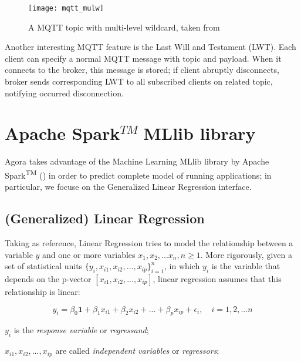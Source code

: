 \begin{figure}[htb]

    \centering
    \texttt{[image: mqtt\_mulw]}
    \caption[A MQTT topic with multi-level wildcard]{A MQTT topic with multi-level wildcard, taken from \cite{site:hivemq}}
    \label{fig:mqtt_mulw}

\end{figure}

Another interesting MQTT feature is the Last Will and Testament (LWT). Each client can specify a normal MQTT message with topic and payload. When it connects to the broker, this message is stored; if client abruptly disconnects, broker sends corresponding LWT to all subscribed clients on related topic, notifying occurred disconnection.





\section{Apache Spark\texorpdfstring{$^{TM}\;$}MMLlib library}

Agora takes advantage of the Machine Learning MLlib library by Apache Spark\textsuperscript{TM} (\cite{spark2015apache}) in order to predict complete model of running applications; in particular, we focuse on the Generalized Linear Regression interface.


\subsection{(Generalized) Linear Regression}\label{glr}

Taking \cite{site:caltechML2012} as reference, Linear Regression tries to model the relationship between a variable $y$ and one or more variables $x_1,x_2,...x_n,n\ge1$. More rigorously, given a set of statistical units $\{y_i,x_{i1},x_{i2},...,x_{ip}\}_{i = 1}^n$, in which $y_i$ is the variable that depends on the p-vector $[x_{i1}, x_{i2}, ..., x_{ip}]$, linear regression assumes that this relationship is linear:

\begin{equation}
    y_i = \beta_0\boldsymbol{1} + \beta_1x_{i1} + \beta_2x_{i2} + ... +  \beta_px_{ip} + \epsilon_i, \quad i = 1, 2, ... n
\end{equation}

$y_i$ is the \textit{response variable} or \textit{regressand};

$x_{i1}, x_{i2}, ..., x_{ip}$ are called \textit{independent variables} or \textit{regressors};

